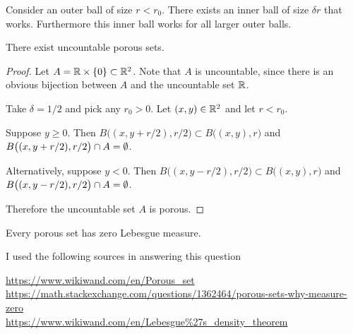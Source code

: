 Consider an outer ball of size $r < r_0$. There exists an inner ball of size $\delta r$ that works. Furthermore
this inner ball works for all larger outer balls.

\begin{claim}
  There exist uncountable porous sets.
\end{claim}

\begin{proof}

  Let $A = \mathbb{R} \times \{0\} \subset \mathbb{R}^2$. Note that $A$ is uncountable, since there is an obvious bijection
  between $A$ and the uncountable set $\mathbb{R}$.

  Take $\delta = 1/2$ and pick any $r_0 > 0$. Let $(x, y) \in \mathbb{R}^2$ and let $r < r_0$.

  Suppose $y \geq 0$. Then $B\big((x, y + r/2), r/2\big) \subset B\big((x, y), r\big)$
  and $B\big((x, y + r/2), r/2\big) \cap A = \emptyset$.

  Alternatively, suppose $y < 0$. Then $B\big((x, y - r/2), r/2\big) \subset B\big((x, y), r\big)$
  and $B\big((x, y - r/2), r/2\big) \cap A = \emptyset$.

  Therefore the uncountable set $A$ is porous.
\end{proof}

\begin{claim}
  Every porous set has zero Lebesgue measure.
\end{claim}

I used the following sources in answering this question

\url{https://www.wikiwand.com/en/Porous_set}\\
\url{https://math.stackexchange.com/questions/1362464/porous-sets-why-measure-zero}\\
\url{https://www.wikiwand.com/en/Lebesgue%27s_density_theorem}\\

